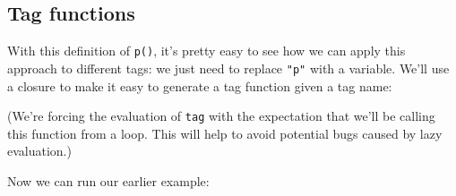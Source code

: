 \subsection{Tag functions}

With this definition of \texttt{p()}, it's pretty easy to see how we can
apply this approach to different tags: we just need to replace
\texttt{"p"} with a variable. We'll use a closure to make it easy to
generate a tag function given a tag name:

\begin{Shaded}
\begin{Highlighting}[]
\StringTok{ }
    \StringTok{ }
    \StringTok{ }\NormalTok{(}
    \StringTok{ }\NormalTok{(}\NormalTok{(}

    \NormalTok{(}\NormalTok{(}
      \NormalTok{,}
       \NormalTok{),}
    \NormalTok{))}
  \NormalTok{\}}
\NormalTok{\}}
\end{Highlighting}
\end{Shaded}

(We're forcing the evaluation of \texttt{tag} with the expectation that
we'll be calling this function from a loop. This will help to avoid
potential bugs caused by lazy evaluation.)

Now we can run our earlier example:

\begin{Shaded}
\begin{Highlighting}[]
\StringTok{ }\NormalTok{(}\NormalTok{)}
\StringTok{ }\NormalTok{(}\NormalTok{)}
\StringTok{ }\NormalTok{(}\NormalTok{)}
\NormalTok{(}\NormalTok{, }\NormalTok{(}\NormalTok{), }\NormalTok{(}\NormalTok{),}
   \NormalTok{)}
\end{Highlighting}
\end{Shaded}

